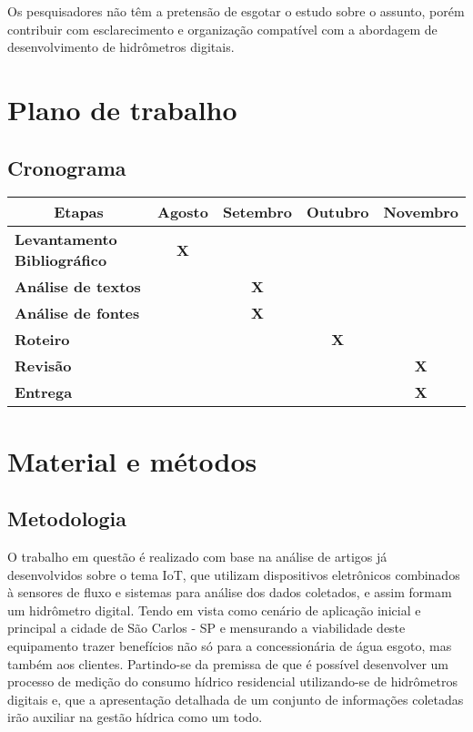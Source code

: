 \documentclass[
	article,			%
	11pt,				%
	oneside,			%
	a4paper,			%
	english,			%
	brazil,				%
	sumario=tradicional,
	doublespacing
	]{abntex2}
\begin{document}
\begin{DoubleSpace}
Os pesquisadores não têm a pretensão de esgotar o estudo sobre o assunto, porém contribuir com esclarecimento e organização compatível com a abordagem de desenvolvimento de hidrômetros digitais.

\section{Plano de trabalho}
\subsection{Cronograma}
    \begin{table}[hbt!]
    \begin{tabular}{|l|c|c|c|c|}
    \hline
    \multicolumn{1}{|c|}{\textbf{Etapas}} & \textbf{Agosto} & \textbf{Setembro} & \textbf{Outubro} & \textbf{Novembro} \\ \hline
    \textbf{Levantamento Bibliográfico} & \textbf{X} & \textbf{} & \textbf{} & \textbf{} \\ \hline
    \textbf{Análise de textos} & \textbf{} & \textbf{X} & \textbf{} & \textbf{} \\ \hline
    \textbf{Análise de fontes} & \textbf{} & \textbf{X} & \textbf{} & \textbf{} \\ \hline
    \textbf{Roteiro} & \textbf{} & \textbf{} & \textbf{X} & \textbf{} \\ \hline
    \textbf{Revisão} & \textbf{} & \textbf{} & \textbf{} & \textbf{X} \\ \hline
    \textbf{Entrega} & \textbf{} & \textbf{} & \textbf{} & \textbf{X} \\ \hline
    \end{tabular}
    \end{table}
    
\section{Material e métodos}
\subsection{Metodologia}

O trabalho em questão é realizado com base na análise de artigos já desenvolvidos sobre o tema IoT, que utilizam dispositivos eletrônicos combinados à sensores de fluxo e sistemas para análise dos dados coletados, e assim formam um hidrômetro digital. Tendo em vista como cenário de aplicação inicial e principal a cidade de São Carlos - SP e mensurando a viabilidade deste equipamento trazer benefícios não só para a concessionária de água esgoto, mas também aos clientes.
Partindo-se da premissa de que é possível desenvolver um processo de medição do consumo hídrico residencial utilizando-se de hidrômetros digitais e, que a apresentação detalhada de um conjunto de informações coletadas irão auxiliar na gestão hídrica como um todo.


\end{DoubleSpace}
\end{document}
